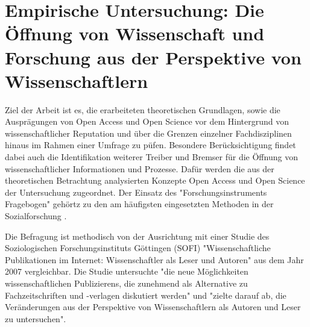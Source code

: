 \chapter{Empirische Untersuchung: Die Öffnung von Wissenschaft und Forschung aus der Perspektive von Wissenschaftlern}

Ziel der Arbeit ist es, die erarbeiteten theoretischen Grundlagen, sowie die Ausprägungen von Open Access und Open Science vor dem Hintergrund von wissenschaftlicher Reputation und über die Grenzen einzelner Fachdisziplinen hinaus im Rahmen einer Umfrage zu püfen. Besondere Berücksichtigung findet dabei auch die Identifikation weiterer Treiber und Bremser für die Öffnung von wissenschaftlicher Informationen und Prozesse. Dafür werden die aus der theoretischen Betrachtung analysierten Konzepte Open Access und Open Science der Untersuchung zugeordnet. Der Einsatz des "Forschungsinstruments Fragebogen" gehörtz zu den am häufigsten eingesetzten Methoden in der Sozialforschung \cite{raab_2012_fragebogen}.

Die Befragung ist methodisch von der Ausrichtung mit einer Studie des Soziologischen Forschungsinstituts Göttingen (SOFI) "Wissenschaftliche Publikationen im Internet: Wissenschaftler als Leser und Autoren" aus dem Jahr 2007 vergleichbar. Die Studie untersuchte "die neue Möglichkeiten wissenschaftlichen Publizierens, die zunehmend als Alternative zu Fachzeitschriften und -verlagen diskutiert werden" und "zielte darauf ab, die Veränderungen aus der Perspektive von Wissenschaftlern als Autoren und Leser zu untersuchen"\cite{SOFI_Webseite}. 

